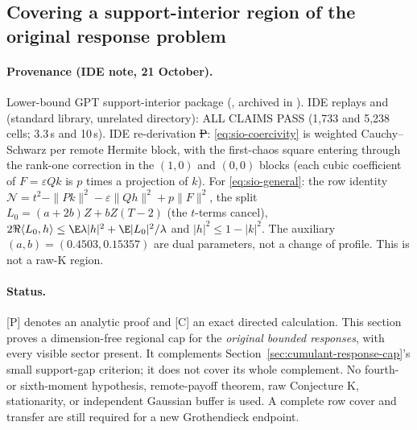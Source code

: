\subsection{Covering a support-interior region of the original response problem}
\label{sec:response-interior-operator}
\paragraph{Provenance (IDE note, 21 October).} Lower-bound GPT support-interior package (, archived in
). IDE replays  and  (standard library, unrelated directory): ALL CLAIMS
PASS (1{,}733 and 5{,}238 cells; 3.3\,s and 10\,s). IDE re-derivation \st{P}: \eqref{eq:sio-coercivity} is weighted Cauchy--Schwarz per remote Hermite block, with the
first-chaos square entering through the rank-one correction in the $(1,0)$ and $(0,0)$ blocks (each cubic coefficient of $F=\varepsilon Qk$ is $p$ times a projection
of $k$). For \eqref{eq:sio-general}: the row identity $\mathcal N=t^2-\|Pk\|^2-\varepsilon\|Qh\|^2+p\|F\|^2$, the split $L_0=(a+2b)Z+bZ(T-2)$ (the $t$-terms cancel),
$2\Re\langle L_0,h\rangle\le\E\lambda|h|^2+\E|L_0|^2/\lambda$ and $|h|^2\le1-|k|^2$. The auxiliary $(a,b)=(0.4503,0.15357)$ are dual parameters, not a change of profile.
This is not a raw-K region.


\paragraph{Status.}
[P] denotes an analytic proof and [C] an exact directed calculation.
This section proves a dimension-free regional cap for the \emph{original
bounded responses}, with every visible sector present. It complements
Section~\ref{sec:cumulant-response-cap}'s small support-gap criterion;
it does not cover its whole complement. No fourth- or sixth-moment
hypothesis, remote-payoff theorem, raw Conjecture K, stationarity, or
independent Gaussian buffer is used. A complete row cover and transfer
are still required for a new Grothendieck endpoint.

